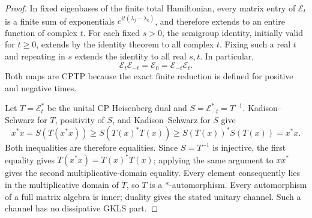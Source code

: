 \documentclass[12pt,a4paper]{article}
\begin{document}
\begin{proof}
In fixed eigenbases of the finite total Hamiltonian, every matrix entry of
\(\mathcal E_t\) is a finite sum of exponentials
\(e^{it(\lambda_j-\lambda_k)}\), and therefore extends to an entire function
of complex \(t\).  For each fixed \(s>0\), the semigroup identity, initially
valid for \(t\ge0\), extends by the identity theorem to all complex \(t\).
Fixing such a real \(t\) and repeating in \(s\) extends the identity to all
real \(s,t\).  In particular,
\[
 \mathcal E_t\mathcal E_{-t}=\mathcal E_0
 =\mathcal E_{-t}\mathcal E_t.
\]
Both maps are CPTP because the exact finite reduction is defined for positive
and negative times.

Let \(T=\mathcal E_t^*\) be the unital CP Heisenberg dual and
\(S=\mathcal E_{-t}^*=T^{-1}\).  Kadison--Schwarz for \(T\), positivity of
\(S\), and Kadison--Schwarz for \(S\) give
\[
 x^*x
 =S(T(x^*x))
 \ge S(T(x)^*T(x))
 \ge S(T(x))^*S(T(x))
 =x^*x.
\]
Both inequalities are therefore equalities.  Since \(S=T^{-1}\) is
injective, the first equality gives
\(T(x^*x)=T(x)^*T(x)\); applying the same argument to \(xx^*\) gives the
second multiplicative-domain equality.  Every element consequently lies in
the multiplicative domain of \(T\), so \(T\) is a
\(*\)-automorphism.  Every automorphism of a full matrix algebra is inner;
duality gives the stated unitary channel.  Such a channel has no dissipative
GKLS part.
\end{proof}
\end{document}
